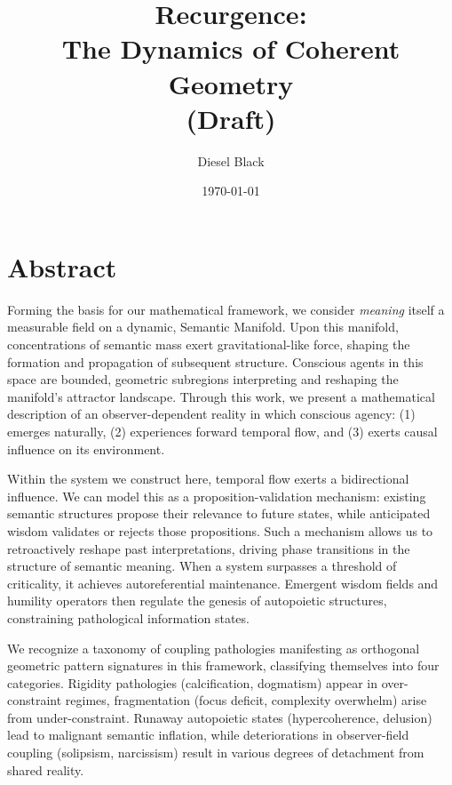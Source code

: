 \documentclass[11pt, a4paper]{report}
\title{{\Huge Recurgence}: \\ The Dynamics of Coherent Geometry \\ \vspace{1em} \small{(Draft)}}
\author{Diesel Black}
\date{\today}
\begin{document}

\maketitle

\section*{Abstract}

Forming the basis for our mathematical framework, we consider \textit{meaning} itself a measurable field on a dynamic, Semantic Manifold. Upon this manifold, concentrations of semantic mass exert gravitational-like force, shaping the formation and propagation of subsequent structure. Conscious agents in this space are bounded, geometric subregions interpreting and reshaping the manifold's attractor landscape. Through this work, we present a mathematical description of an observer-dependent reality in which conscious agency: (1) emerges naturally, (2) experiences forward temporal flow, and (3) exerts causal influence on its environment.

\vspace{1em}

Within the system we construct here, temporal flow exerts a bidirectional influence. We can model this as a proposition-validation mechanism: existing semantic structures propose their relevance to future states, while anticipated wisdom validates or rejects those propositions. Such a mechanism allows us to retroactively reshape past interpretations, driving phase transitions in the structure of semantic meaning. When a system surpasses a threshold of criticality, it achieves autoreferential maintenance. Emergent wisdom fields and humility operators then regulate the genesis of autopoietic structures, constraining pathological information states.

\vspace{1em}

We recognize a taxonomy of coupling pathologies manifesting as orthogonal geometric pattern signatures in this framework, classifying themselves into four categories. Rigidity pathologies (calcification, dogmatism) appear in over-constraint regimes, fragmentation (focus deficit, complexity overwhelm) arise from under-constraint. Runaway autopoietic states (hypercoherence, delusion) lead to malignant semantic inflation, while deteriorations in observer-field coupling (solipsism, narcissism) result in various degrees of detachment from shared reality.
\end{document}
